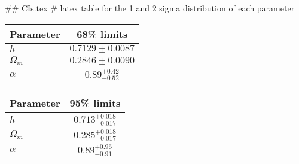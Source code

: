 ## CIs.tex
# latex table for the 1 and 2 sigma distribution of each parameter

\begin{tabular} { l  c}
 Parameter &  68\% limits\\
\hline
{\boldmath$h              $} & $0.7129\pm 0.0087          $\\
{\boldmath$\Omega_m       $} & $0.2846\pm 0.0090          $\\
{\boldmath$\alpha         $} & $0.89^{+0.42}_{-0.52}      $\\
\hline
\end{tabular}

\begin{tabular} { l  c}
 Parameter &  95\% limits\\
\hline
{\boldmath$h              $} & $0.713^{+0.018}_{-0.017}   $\\
{\boldmath$\Omega_m       $} & $0.285^{+0.018}_{-0.017}   $\\
{\boldmath$\alpha         $} & $0.89^{+0.96}_{-0.91}      $\\
\hline
\end{tabular}
